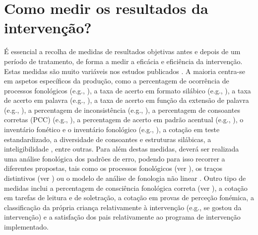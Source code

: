 \documentclass[output=paper,colorlinks,citecolor=brown,booklanguage=portuguese]{langscibook}
\begin{document}
\section{Como medir os resultados da intervenção?}\label{sec:cap7sec2}
É essencial a recolha de medidas de resultados objetivas antes e depois de um período de tratamento, de forma a medir a eficácia e eficiência da intervenção. Estas medidas são muito variáveis nos estudos publicados \citep{Baker2011, Wren2018}. A maioria centra-se em aspetos específicos da produção, como a percentagem de ocorrência de processos fonológicos (e.g., \citealp{Weiner1981, Lousada2013}), a taxa de acerto em formato silábico (e.g., \citealp{Major1998}), a taxa de acerto em palavra (e.g., \citealp{StoelGammon2010}), a taxa de acerto em função da extensão de palavra (e.g., \citealp{Hammarstroem2019}), a percentagem de inconsistência (e.g., \citealp{McIntosh2008}), a percentagem de consoantes corretas (PCC) (e.g., \citealp{Tyler2003, Lousada2013}), a percentagem de acerto em padrão acentual (e.g., \citealp{Hammarstroem2019}), o inventário fonético e o inventário fonológico (e.g., \citealp{Dinnsen1992, Yavas2001, Lousada2013}), a cotação em teste estandardizado, a diversidade de consoantes e estruturas silábicas, a inteligibilidade \citep{Lousada2014}, entre outras. Para além destas medidas, deverá ser realizada uma análise fonológica dos padrões de erro, podendo para isso recorrer a diferentes propostas, tais como os processos fonológicos (ver ), os traços distintivos (ver ) ou o modelo de análise de fonologia não linear \citep{Bernhardt2000}. Outro tipo de medidas inclui a percentagem de consciência fonológica correta (ver ), a cotação em tarefas de leitura e de soletração, a cotação em provas de perceção fonémica, a classificação da própria criança relativamente à intervenção (e.g., se gostou da intervenção) e a satisfação dos pais relativamente ao programa de intervenção implementado.  
\end{document}
